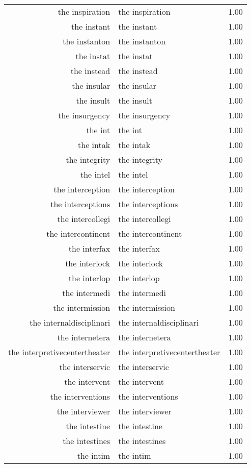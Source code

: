 \begin{table}[ht]
\begin{tabular}{rlr}
  the inspiration & the inspiration & 1.00 \\ 
  the instant & the instant & 1.00 \\ 
  the instanton & the instanton & 1.00 \\ 
  the instat & the instat & 1.00 \\ 
  the instead & the instead & 1.00 \\ 
  the insular & the insular & 1.00 \\ 
  the insult & the insult & 1.00 \\ 
  the insurgency & the insurgency & 1.00 \\ 
  the int & the int & 1.00 \\ 
  the intak & the intak & 1.00 \\ 
  the integrity & the integrity & 1.00 \\ 
  the intel & the intel & 1.00 \\ 
  the interception & the interception & 1.00 \\ 
  the interceptions & the interceptions & 1.00 \\ 
  the intercollegi & the intercollegi & 1.00 \\ 
  the intercontinent & the intercontinent & 1.00 \\ 
  the interfax & the interfax & 1.00 \\ 
  the interlock & the interlock & 1.00 \\ 
  the interlop & the interlop & 1.00 \\ 
  the intermedi & the intermedi & 1.00 \\ 
  the intermission & the intermission & 1.00 \\ 
  the internaldisciplinari & the internaldisciplinari & 1.00 \\ 
  the internetera & the internetera & 1.00 \\ 
  the interpretivecentertheater & the interpretivecentertheater & 1.00 \\ 
  the interservic & the interservic & 1.00 \\ 
  the intervent & the intervent & 1.00 \\ 
  the interventions & the interventions & 1.00 \\ 
  the interviewer & the interviewer & 1.00 \\ 
  the intestine & the intestine & 1.00 \\ 
  the intestines & the intestines & 1.00 \\ 
  the intim & the intim & 1.00 \\ 

\end{tabular}
\end{table}
